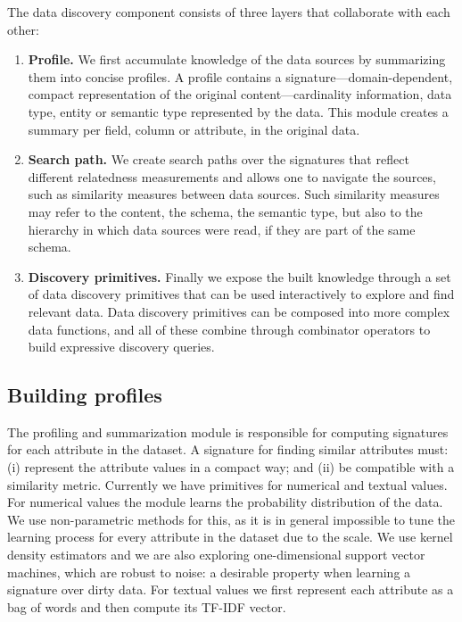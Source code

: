 
The data discovery component consists of three layers that collaborate with each other:

\begin{enumerate}
\item {\bf Profile.} We first accumulate knowledge of the data sources by summarizing them
into concise profiles. A profile contains a signature---domain-dependent,
compact representation of the original content---cardinality information, data
type, entity or semantic type represented by the data. This module creates a
summary per field, \ie column or attribute, in the original data.
\item {\bf Search path.} We create search paths over the signatures that reflect different relatedness
measurements and allows one to navigate the sources, such as similarity measures
between data sources. Such similarity measures may refer to the content, the
schema, the semantic type, but also to the hierarchy in which data sources were
read, \ie if they are part of the same schema.
\item {\bf Discovery primitives.} Finally we expose the built knowledge through a set of data discovery
primitives that can be used interactively to explore and find relevant data.
Data discovery primitives can be composed into more complex data functions, and
all of these combine through combinator operators to build expressive discovery
queries.
\end{enumerate}


\subsection{Building profiles}

The profiling and summarization module is responsible
for computing signatures for each attribute in the dataset. A signature for
finding similar attributes must: (i) represent the attribute values in a compact
way; and (ii) be compatible with a similarity metric. Currently we have
primitives for numerical and textual values. For numerical values the module
learns the probability distribution of the data. We use non-parametric methods
for this, as it is in general impossible to tune the learning process for every
attribute in the dataset due to the scale. We use kernel density estimators and
we are also exploring one-dimensional support vector machines, which are robust
to noise: a desirable property when learning a signature over dirty data. For
textual values we first represent each attribute as a bag of words and then
compute its TF-IDF vector.

